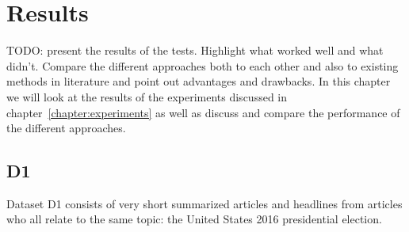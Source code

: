\chapter{Results}
\label{chapter:results}
TODO: present the results of the tests. Highlight what worked well and what didn't. Compare the different approaches both to each other and also to existing methods in literature and point out advantages and drawbacks.
In this chapter we will look at the results of the experiments discussed in chapter~\ref{chapter:experiments} as well as discuss and compare the performance of the different approaches.

\section{D1}
Dataset D1 consists of very short summarized articles and headlines from articles who all relate to the same topic: the United States 2016 presidential election.
